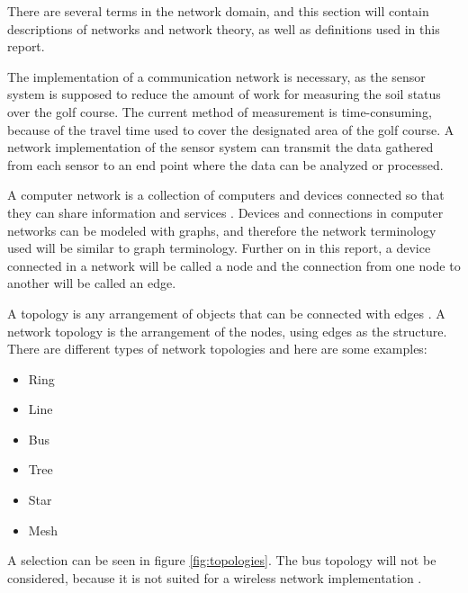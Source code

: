 There are several terms in the network domain, and this section will contain descriptions of networks and network theory, as well as definitions used in this report. 

The implementation of a communication network is necessary, as the sensor system is supposed to reduce the amount of work for measuring the soil status over the golf course. The current method of measurement is time-consuming, because of the travel time used to cover the designated area of the golf course. A network implementation of the sensor system can transmit the data gathered from each sensor to an end point where the data can be analyzed or processed.

A computer network is a collection of computers and devices connected so that they can share information and services \cite{mansfield2009computer}. Devices and connections in computer networks can be modeled with graphs, and therefore the network terminology used will be similar to graph terminology. Further on in this report, a device connected in a network will be called a node and the connection from one node to another will be called an edge.



A topology is any arrangement of objects that can be connected with edges \cite[p.~628]{discMath}. A network topology is the arrangement of the nodes, using edges as the structure. There are different types of network topologies and here are some examples:
\begin{itemize}
	\item Ring
	\item Line
	\item Bus
	\item Tree
	\item Star
	\item Mesh
\end{itemize}

A selection can be seen in figure \ref{fig:topologies}. The bus topology will not be considered, because it is not suited for a wireless network implementation \cite{re-find-it}. 


